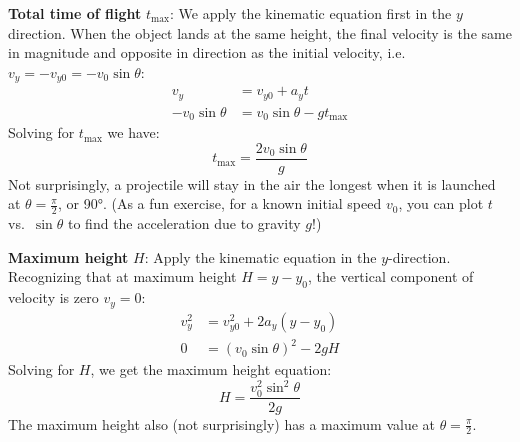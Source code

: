 \documentclass{../../../oss-handout}
\begin{document}
\textbf{Total time of flight} $t_\text{max}$: We apply the kinematic equation
first in the $y$ direction. When the object lands at the same height, the final
velocity is the same in magnitude and opposite in direction as the initial
velocity, i.e.\  $v_y=-v_{y0}=-v_0\sin\theta$:
\begin{align*}
  v_y &=v_{y0}+a_yt\\
  -v_0\sin\theta &=v_0\sin\theta -g t_\text{max}
\end{align*}
Solving for $t_\text{max}$ we have:
\begin{equation}
  \boxed{
    t_\text{max}=\frac{2v_0\sin\theta}g
  }
  \label{tmax}
\end{equation}
Not surprisingly, a projectile will stay in the air the longest when it is
launched at $\displaystyle\theta=\frac{\pi}2$, or \ang{90}. (As a fun exercise,
for a known initial speed $v_0$, you can plot $t$ vs.\ $\sin\theta$ to find the
acceleration due to gravity $g$!)

\textbf{Maximum height} $H$: Apply the kinematic equation in the $y$-direction.
Recognizing that at maximum height $H=y-y_0$, the vertical component of
velocity is zero $v_y=0$:
\begin{align*}
  v_y^2 &= v_{y0}^2 + 2a_y(y-y_0)\\
  0  &= (v_0\sin\theta)^2-2gH
\end{align*}
Solving for $H$, we get the maximum height equation:
\begin{equation}
  \boxed{H=\frac{v_0^2\sin^2\theta}{2g}}
\end{equation}
The maximum height also (not surprisingly) has a maximum value at
$\displaystyle\theta=\frac{\pi}2$.
\end{document}
